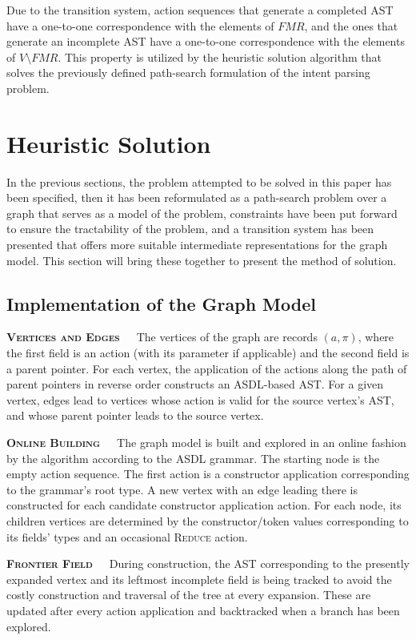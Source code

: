 \documentclass[12pt]{article}
\begin{document}
Due to the transition system, action sequences that generate a completed AST have a one-to-one correspondence with the elements of $FMR$, and the ones that generate an incomplete AST have a one-to-one correspondence with the elements of $V \setminus FMR$. This property is utilized by the heuristic solution algorithm that solves the previously defined path-search formulation of the intent parsing problem.

\section{Heuristic Solution}

In the previous sections, the problem attempted to be solved in this paper has been specified, then it has been reformulated as a path-search problem over a graph that serves as a model of the problem, constraints have been put forward to ensure the tractability of the problem, and a transition system has been presented that offers more suitable intermediate representations for the graph model. This section will bring these together to present the method of solution.

\subsection{Implementation of the Graph Model}

\textbf{\textsc{Vertices and Edges}}\ \ \ The vertices of the graph are records $(a, \pi)$, where the first field is an action (with its parameter if applicable) and the second field is a parent pointer. For each vertex, the application of the actions along the path of parent pointers in reverse order constructs an ASDL-based AST. For a given vertex, edges lead to vertices whose action is valid for the source vertex's AST, and whose parent pointer leads to the source vertex.

\textbf{\textsc{Online Building}}\ \ \ The graph model is built and explored in an online fashion by the algorithm according to the ASDL grammar. The starting node is the empty action sequence. The first action is a constructor application corresponding to the grammar's root type. A new vertex with an edge leading there is constructed for each candidate constructor application action. For each node, its children vertices are determined by the constructor/token values corresponding to its fields' types and an occasional \textsc{Reduce} action.

\textbf{\textsc{Frontier Field}}\ \ \ During construction, the AST corresponding to the presently expanded vertex and its leftmost incomplete field is being tracked to avoid the costly construction and traversal of the tree at every expansion. These are updated after every action application and backtracked when a branch has been explored.
\end{document}
